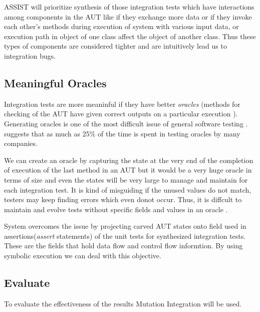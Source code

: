 ASSIST will prioritize synthesis of those integration tests which have interactions among components in the AUT like if they exchange more data or if they invoke each other's methods during execution of system with various input data, or execution path in object of one class affect the object of another class. Thus these types of components are considered tighter and are intuitively lead us to integration bugs.
 
\subsection{Meaningful Oracles}
Integration tests are more meaninful if they have better \emph{oracles} (methods for checking of the AUT have given correct outputs on a particular execution  \cite{Baresi:Oracles}). Generating oracles is one of the most difficult issue of general software testing \cite{Baresi:Oracles,Peters1994,Richardson-icse92,Richardson1994,dillon-sigsoft94}. \cite{MYSOA:07} suggests that as much as 25\% of the time is spent in testing oracles by many companies.

We can create an oracle by capturing the state at the very end of the completion of execution of the last method in an AUT but it would be a very huge oracle in terms of size and even the states will be very large to manage and maintain for each integration test. It is kind of misguiding if the unused values do not match, testers may keep finding errors which even donot occur. Thus, it is diffcult to maintain and evolve tests without specific fields and values in an oracle \cite{Daniel:2009:RSR:1747491.1747538}.

System overcomes the issue by projecting carved AUT states onto field used in assertions(\emph{assert} statements) of the unit tests for synthesized integration tests. These are the fields that hold data flow and control flow informtion. By using symbolic execution \cite{Boyer:1975:SFS:800027.808445,DBLP:journals/cacm/King76,DBLP:journals/tse/Clarke76,csallner08dysy,godefroid05dart,sen06cute,SYMEX:81,KING:71}
we can deal with this objective.

\subsection{Evaluate}
To evaluate the effectiveness of the results Mutation Integration will be used.


